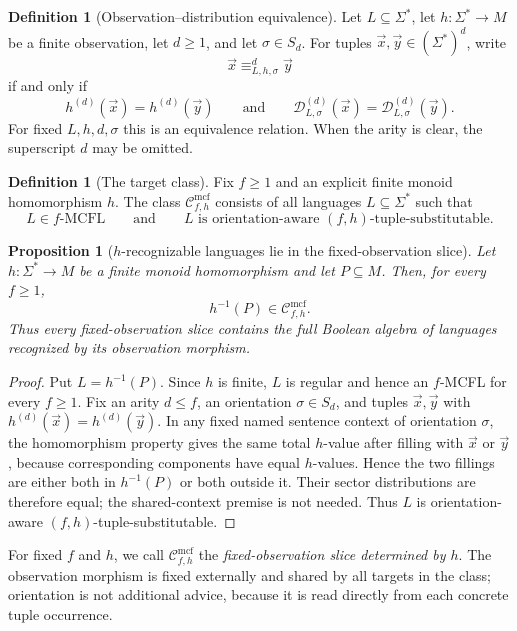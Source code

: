 \documentclass[11pt,a4paper]{article}
\numberwithin{equation}{section}
\theoremstyle{plain}
\newtheorem{proposition}[theorem]{Proposition}
\theoremstyle{definition}
\newtheorem{definition}[theorem]{Definition}
\theoremstyle{remark}
\newcommand{\Cmcf}[2]{\mathcal{C}^{\mathrm{mcf}}_{#1,#2}}
\newcommand{\D}{\mathcal{D}}
\newcommand{\tuple}[1]{\vec{#1}}
\begin{document}
\begin{definition}[Observation--distribution equivalence]
\label{def:observation-distribution-equivalence}
Let $L\subseteq\Sigma^*$, let $h:\Sigma^*\to M$ be a finite observation,
let $d\ge1$, and let $\sigma\in S_d$.  For tuples
$\tuple x,\tuple y\in(\Sigma^*)^d$, write
\[
  \tuple x\equiv_{L,h,\sigma}^d\tuple y
\]
if and only if
\[
  h^{(d)}(\tuple x)=h^{(d)}(\tuple y)
  \qquad\text{and}\qquad
  \D_{L,\sigma}^{(d)}(\tuple x)=\D_{L,\sigma}^{(d)}(\tuple y).
\]
For fixed $L,h,d,\sigma$ this is an equivalence relation.  When the arity is
clear, the superscript $d$ may be omitted.
\end{definition}

\begin{definition}[The target class]
\label{def:class-cmcf}
Fix \(f\ge1\) and an explicit finite monoid homomorphism \(h\).  The class
\(\Cmcf{f}{h}\) consists of all languages \(L\subseteq\Sigma^*\) such that
\[
  L\in f\text{-}\mathrm{MCFL}
  \qquad\text{and}\qquad
  L\text{ is orientation-aware }(f,h)\text{-tuple-substitutable}.
\]
\end{definition}

\begin{proposition}[$h$-recognizable languages lie in the fixed-observation slice]
\label{prop:h-recognizable-in-slice}
Let $h:\Sigma^*\to M$ be a finite monoid homomorphism and let $P\subseteq M$.
Then, for every $f\ge1$,
\[
  h^{-1}(P)\in\Cmcf{f}{h}.
\]
Thus every fixed-observation slice contains the full Boolean algebra of
languages recognized by its observation morphism.
\end{proposition}

\begin{proof}
Put $L=h^{-1}(P)$.  Since $h$ is finite, $L$ is regular and hence an
$f$-MCFL for every $f\ge1$.  Fix an arity $d\le f$, an orientation
$\sigma\in S_d$, and tuples $\tuple x,\tuple y$ with
$h^{(d)}(\tuple x)=h^{(d)}(\tuple y)$.  In any fixed named sentence context
of orientation $\sigma$, the homomorphism property gives the same total
$h$-value after filling with $\tuple x$ or $\tuple y$, because corresponding
components have equal $h$-values.  Hence the two fillings are either both in
$h^{-1}(P)$ or both outside it.  Their sector distributions are therefore
equal; the shared-context premise is not needed.  Thus $L$ is
orientation-aware $(f,h)$-tuple-substitutable.
\end{proof}

For fixed \(f\) and \(h\), we call \(\Cmcf{f}{h}\) the
\emph{fixed-observation slice determined by \(h\)}.  The observation morphism
is fixed externally and shared by all targets in the class; orientation is
not additional advice, because it is read directly from each concrete tuple
occurrence.
\end{document}
